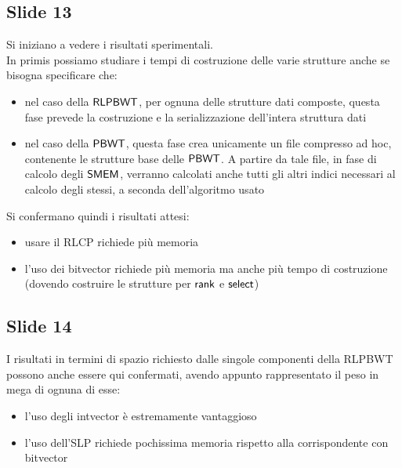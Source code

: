 \documentclass[a4paper,11pt, oneside,italian]{article}
\def\rank{\mbox{\rm {\sf rank}}}
\def\select{\mbox{\rm {\sf select}}}
\def\PBWT{\mbox{\rm {\sf PBWT}}}
\def\RLPBWT{\mbox{\rm {\sf RLPBWT}}}
\def\SMEM{\mbox{\rm {\sf SMEM}}}
\begin{document}
\subsection*{Slide 13}
Si iniziano a vedere i risultati sperimentali.\\
In primis possiamo studiare i tempi di costruzione delle varie strutture anche
se bisogna specificare che:
\begin{itemize}
  \item nel caso della $\RLPBWT$, per ognuna delle strutture dati
  composte, questa fase prevede la costruzione e la 
  serializzazione dell'intera struttura dati
  \item nel caso della $\PBWT$, questa fase crea unicamente un file
  compresso ad hoc, contenente le strutture base delle $\PBWT$. A partire
  da tale file, in fase di calcolo degli $\SMEM$, verranno calcolati anche
  tutti gli altri indici necessari al calcolo degli stessi, a seconda
  dell'algoritmo usato 
\end{itemize}
Si confermano quindi i risultati attesi:
\begin{itemize}
  \item usare il RLCP richiede più memoria
  \item l'uso dei bitvector richiede più memoria ma anche più tempo di
  costruzione (dovendo costruire le strutture per $\rank$ e $\select$)
\end{itemize}
\subsection*{Slide 14}
I risultati in termini di spazio richiesto dalle singole componenti della RLPBWT
possono anche essere qui confermati, avendo appunto rappresentato il peso in
mega di ognuna di esse:
\begin{itemize}
  \item l'uso degli intvector è estremamente vantaggioso
  \item l'uso dell'SLP richiede pochissima memoria rispetto alla corrispondente
  con bitvector
\end{itemize}
\end{document}
